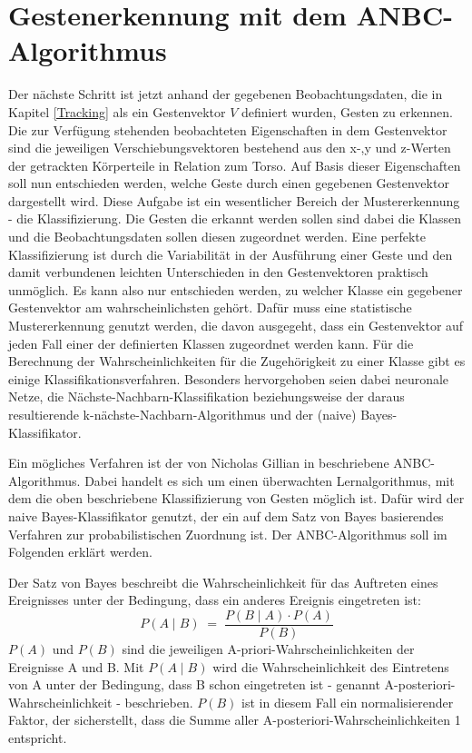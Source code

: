 \section{Gestenerkennung mit dem ANBC-Algorithmus}
Der nächste Schritt ist jetzt anhand der gegebenen Beobachtungsdaten, die in Kapitel \ref{Tracking} als ein Gestenvektor $V$ definiert wurden, Gesten zu erkennen. Die zur Verfügung stehenden beobachteten Eigenschaften in dem Gestenvektor sind die jeweiligen Verschiebungsvektoren bestehend aus den x-,y und z-Werten der getrackten Körperteile in Relation zum Torso. Auf Basis dieser Eigenschaften soll nun entschieden werden, welche Geste durch einen gegebenen Gestenvektor dargestellt wird. Diese Aufgabe ist ein wesentlicher Bereich der Mustererkennung - die Klassifizierung. Die Gesten die erkannt werden sollen sind dabei die Klassen und die Beobachtungsdaten sollen diesen zugeordnet werden. Eine perfekte Klassifizierung ist durch die Variabilität in der Ausführung einer Geste und den damit verbundenen leichten Unterschieden in den Gestenvektoren praktisch unmöglich. Es kann also nur entschieden werden, zu welcher Klasse ein gegebener Gestenvektor am wahrscheinlichsten gehört. Dafür muss eine statistische Mustererkennung genutzt werden, die davon ausgegeht, dass ein Gestenvektor auf jeden Fall einer der definierten Klassen zugeordnet werden kann. Für die Berechnung der Wahrscheinlichkeiten für die Zugehörigkeit zu einer Klasse gibt es einige Klassifikationsverfahren. Besonders hervorgehoben seien dabei neuronale Netze, die Nächste-Nachbarn-Klassifikation beziehungsweise der daraus resultierende k-nächste-Nachbarn-Algorithmus \cite{nearestNeighbor} und der (naive) Bayes-Klassifikator.~\cite{patternClassification1, patternRecognitionTheory}

Ein mögliches Verfahren ist der von Nicholas Gillian in \cite{gillianANBC} beschriebene ANBC-Algorithmus. Dabei handelt es sich um einen überwachten Lernalgorithmus, mit dem die oben beschriebene Klassifizierung von Gesten möglich ist. Dafür wird der naive Bayes-Klassifikator genutzt, der ein auf dem Satz von Bayes basierendes Verfahren zur probabilistischen Zuordnung ist. Der ANBC-Algorithmus soll im Folgenden erklärt werden.

Der Satz von Bayes beschreibt die Wahrscheinlichkeit für das Auftreten eines Ereignisses unter der Bedingung, dass ein anderes Ereignis eingetreten ist:
\begin{equation}
    P(A\mid B) \; = \; \frac {P(B\mid A) \cdot P(A)} {P(B)}
\end{equation}
$P(A)$ und $P(B)$ sind die jeweiligen A-priori-Wahrscheinlichkeiten der Ereignisse A und B. Mit $P(A\mid B)$ wird die Wahrscheinlichkeit des Eintretens von A unter der Bedingung, dass B schon eingetreten ist - genannt A-posteriori-Wahrscheinlichkeit - beschrieben. $P(B)$ ist in diesem Fall ein normalisierender Faktor, der sicherstellt, dass die Summe aller A-posteriori-Wahrscheinlichkeiten 1 entspricht.

